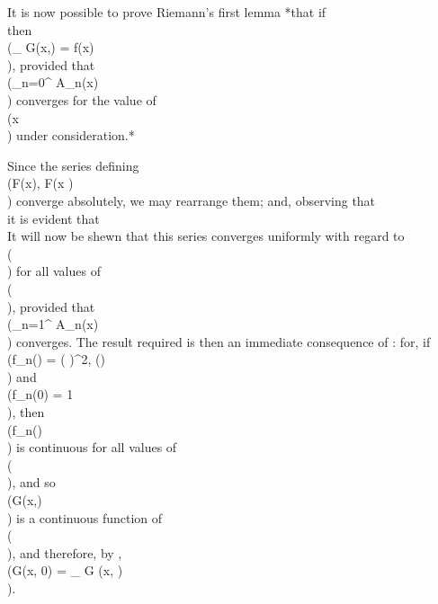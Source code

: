 It is now possible to prove Riemann's first lemma *that if
  \\[ 
  G(x, \alpha)
  =
  \frac{F(x + 2\alpha) + F(x - 2\alpha) - 2F(x)}{4 \alpha^{2}},
  \\] 
  then \\(\lim_{\alpha {}} G(x,\alpha) = f(x)\\), provided that
  \\(\sum_{n=0}^{\infty} A_{n}(x)\\) converges for the value
  of \\(x\\) under consideration.*

Since the series defining \\(F(x), F(x \alpha)\\) converge absolutely, we may
rearrange them; and, observing that
\\[ \begin{align*}
  \cos n(x + 2\alpha) + \cos n(x - 2\alpha) - 2 \cos nx =& -4 \sin^{2} n\alpha \cos nx,\\
  \sin n(x + 2\alpha) + \sin n(x - 2\alpha) - 2 \sin nx =& -4 \sin^{2} n\alpha \sin nx,
\end{align*} \\]
it is evident that
\\[ 
G(x, \alpha)
=
A_{0}
+
\sum_{n=1}^{\infty}
\left(
  \frac{\sin n\alpha}{n\alpha}
\right)^{2}
A_{n}(x).
\\] 

It will now be shewn that this series converges uniformly with regard
to \\(\alpha\\) for all values of \\(\alpha\\), provided that
\\(\sum_{n=1}^{\infty} A_{n}(x)\\) converges. The result
required is then an immediate consequence of :
for, if
\\(f_{n}(\alpha) = \left(
\right)^{2}, (\alpha {})\\)
and \\(f_{n}(0) = 1\\), then \\(f_{n}(\alpha)\\) is continuous for all values of \\(\alpha\\), and so
\\(G(x,\alpha)\\) is a continuous function of \\(\alpha\\), and therefore, by ,
\\(G(x, 0) = \lim_{\alpha \rightarrow \infty} G (x, \alpha)\\).

